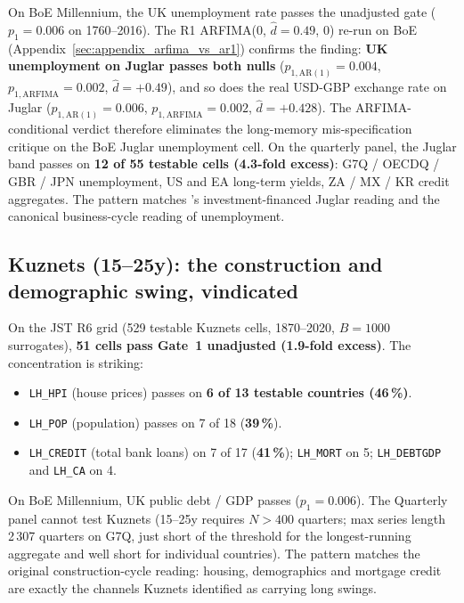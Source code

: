 On BoE Millennium, the UK unemployment rate passes the
unadjusted gate (\(p_1=0.006\) on 1760--2016). The R1
ARFIMA(0, \(\hat d=0.49\), 0) re-run on BoE
(Appendix~\ref{sec:appendix_arfima_vs_ar1}) confirms the
finding: \textbf{UK unemployment on Juglar passes both
nulls} (\(p_{1,\mathrm{AR(1)}}=0.004\),
\(p_{1,\mathrm{ARFIMA}}=0.002\), \(\hat d=+0.49\)), and so
does the real USD-GBP exchange rate on Juglar
(\(p_{1,\mathrm{AR(1)}}=0.006\),
\(p_{1,\mathrm{ARFIMA}}=0.002\), \(\hat d=+0.428\)). The
ARFIMA-conditional verdict therefore eliminates the
long-memory mis-specification critique on the BoE Juglar
unemployment cell. On the quarterly panel, the Juglar band
passes on \textbf{12 of 55 testable cells (4.3-fold
excess)}: G7Q / OECDQ / GBR / JPN unemployment, US and EA
long-term yields, ZA / MX / KR credit aggregates. The
pattern matches \citet{schumpeter1939}'s investment-financed
Juglar reading and the canonical business-cycle reading of
unemployment.

\subsection{Kuznets (15--25y): the construction and demographic swing, vindicated}
\label{sec:kuznets_results}

On the JST R6 grid (529 testable Kuznets cells, 1870--2020,
\(B=1000\) surrogates), \textbf{51 cells pass Gate~1 unadjusted
(1.9-fold excess)}. The concentration is striking:

\begin{itemize}
\item \texttt{LH\_HPI} (house prices) passes on \textbf{6 of
  13 testable countries (46\,\%)}.
\item \texttt{LH\_POP} (population) passes on 7 of 18
  (\textbf{39\,\%}).
\item \texttt{LH\_CREDIT} (total bank loans) on 7 of 17
  (\textbf{41\,\%}); \texttt{LH\_MORT} on 5; \texttt{LH\_DEBTGDP}
  and \texttt{LH\_CA} on 4.
\end{itemize}

On BoE Millennium, UK public debt / GDP passes (\(p_1=0.006\)).
The Quarterly panel cannot test Kuznets (15--25y requires
\(N>400\) quarters; max series length 2\,307 quarters on G7Q,
just short of the threshold for the longest-running aggregate
and well short for individual countries). The pattern matches
the original \citet{kuznets1930} construction-cycle reading:
housing, demographics and mortgage credit are exactly the
channels Kuznets identified as carrying long swings.

